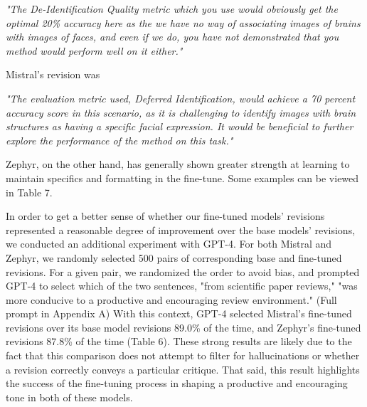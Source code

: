 \textit{"The De-Identification Quality metric which you use would obviously get the optimal 20\% accuracy here as the we have no way of associating images of brains with images of faces, and even if we do, you have not demonstrated that you method would perform well on it either."}

\noindent Mistral's revision was

\textit{"The evaluation metric used, Deferred Identification, would achieve a 70 percent accuracy score in this scenario, as it is challenging to identify images with brain structures as having a specific facial expression. It would be beneficial to further explore the performance of the method on this task."}

Zephyr, on the other hand, has generally shown greater strength at learning to maintain specifics and formatting in the fine-tune. Some examples can be viewed in Table 7.

In order to get a better sense of whether our fine-tuned models' revisions represented a reasonable degree of improvement over the base models' revisions, we conducted an additional experiment with GPT-4. For both Mistral and Zephyr, we randomly selected 500 pairs of corresponding base and fine-tuned revisions. For a given pair, we randomized the order to avoid bias, and prompted GPT-4 to select which of the two sentences, "from scientific paper reviews," "was more conducive to a productive and encouraging review environment." (Full prompt in Appendix A) With this context, GPT-4 selected Mistral's fine-tuned revisions over its base model revisions 89.0\% of the time, and Zephyr's fine-tuned revisions 87.8\% of the time (Table 6). These strong results are likely due to the fact that this comparison does not attempt to filter for hallucinations or whether a revision correctly conveys a particular critique. That said, this result highlights the success of the fine-tuning process in shaping a productive and encouraging tone in both of these models.
